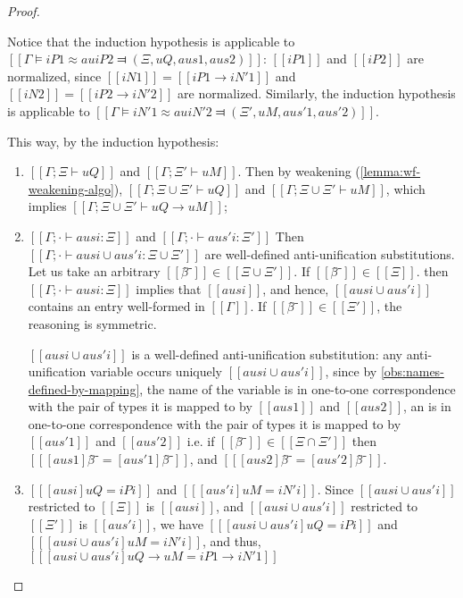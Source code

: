 \begin{proof}
\begin{caseof}
                Notice that the induction hypothesis is applicable to 
                $[[Γ ⊨ iP1 ≈au iP2 ⫤ (Ξ, uQ, aus1, aus2)]]$:
                $[[iP1]]$ and $[[iP2]]$ are normalized, since $[[iN1]] = [[iP1 → iN'1]]$
                and $[[iN2]] = [[iP2 → iN'2]]$ are normalized.
                Similarly, the induction hypothesis is applicable to
                $[[Γ ⊨ iN'1 ≈au iN'2 ⫤ (Ξ', uM, aus'1, aus'2)]]$.

                This way, by the induction hypothesis:
                \begin{enumerate}
                    \item $[[Γ ; Ξ ⊢ uQ]]$ and $[[Γ ; Ξ' ⊢ uM]]$. 
                    Then by weakening (\cref{lemma:wf-weakening-algo}), 
                    $[[Γ ; Ξ ∪ Ξ' ⊢ uQ]]$ and 
                    $[[Γ ; Ξ ∪ Ξ' ⊢ uM]]$, which implies $[[Γ ; Ξ ∪ Ξ' ⊢ uQ → uM]]$;

                    \item $[[Γ ; · ⊢ ausi : Ξ]]$ and $[[Γ ; · ⊢ aus'i : Ξ']]$
                        Then $[[Γ ; · ⊢ ausi ∪ aus'i : Ξ ∪ Ξ']]$
                        are well-defined anti-unification substitutions.
                        Let us take an arbitrary $[[β̂⁻]] \in [[Ξ ∪ Ξ']]$.
                        If $[[β̂⁻]] \in [[Ξ]]$.
                        then $[[Γ ; · ⊢ ausi : Ξ]]$ implies that $[[ausi]]$, and hence,
                        $[[ausi ∪ aus'i]]$ contains an entry well-formed in $[[Γ]]$.
                        If $[[β̂⁻]] \in [[Ξ']]$, the reasoning is symmetric.

                        $[[ausi ∪ aus'i]]$ is a well-defined anti-unification substitution:
                        any anti-unification variable occurs 
                        uniquely $[[ausi ∪ aus'i]]$, since by \cref{obs:names-defined-by-mapping},
                        the name of the variable is in one-to-one correspondence with 
                        the pair of types it is mapped to
                        by $[[aus1]]$ and $[[aus2]]$, 
                        an is in one-to-one correspondence with the pair of types it is mapped to
                        by $[[aus'1]]$ and $[[aus'2]]$ 
                        i.e.  if $[[β̂⁻]] \in [[Ξ ∩ Ξ']]$ then $[[ [aus1]β̂⁻ = [aus'1]β̂⁻ ]]$,
                        and $[[ [aus2]β̂⁻ = [aus'2]β̂⁻ ]]$.

                    \item $[[ [ausi] uQ = iPi ]]$ and $[[ [aus'i] uM = iN'i ]]$.
                    Since $[[ausi ∪ aus'i]]$ restricted to $[[Ξ]]$ is $[[ausi]]$,
                    and $[[ausi ∪ aus'i]]$ restricted to $[[Ξ']]$ is $[[aus'i]]$,
                    we have $[[ [ausi ∪ aus'i] uQ = iPi ]]$ and 
                    $[[ [ausi ∪ aus'i] uM = iN'i ]]$, and thus, 
                    $[[ [ausi ∪ aus'i] uQ → uM = iP1 → iN'1 ]]$
                \end{enumerate}


\end{caseof}
\end{proof}
